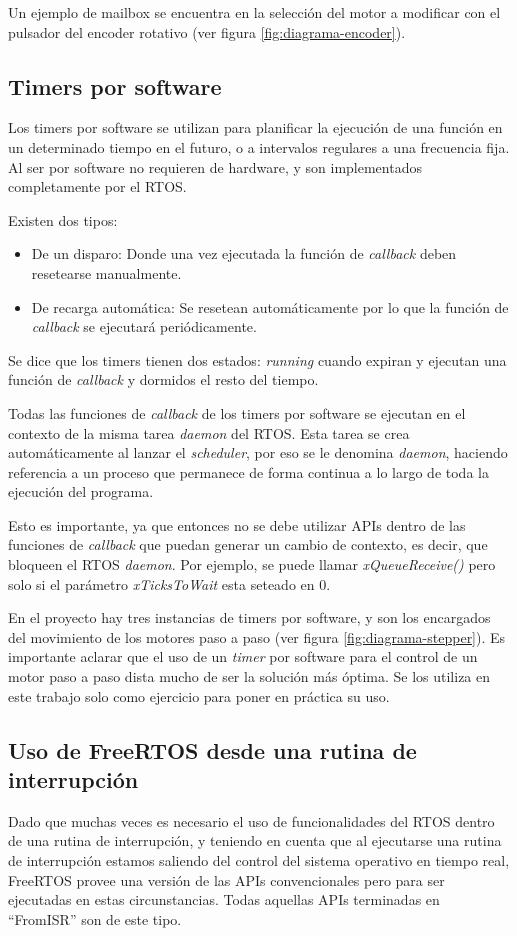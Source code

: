 \documentclass{IEEEtran}
\begin{document}
Un ejemplo de mailbox se encuentra en la selección del motor a modificar con el pulsador del encoder rotativo (ver figura \ref{fig:diagrama-encoder}).

\subsection{Timers por software}
\label{sec:software-timer}
Los timers por software se utilizan para planificar la ejecución de una función en un determinado tiempo en el futuro, o a intervalos regulares a una frecuencia fija. Al ser por software no requieren de hardware, y son implementados completamente por el RTOS.

Existen dos tipos:
\begin{itemize}
    \item De un disparo: Donde una vez ejecutada la función de \textit{callback} deben resetearse manualmente.
    \item De recarga automática: Se resetean automáticamente por lo que la función de \textit{callback} se ejecutará periódicamente.
\end{itemize}

Se dice que los timers tienen dos estados: \textit{running} cuando expiran y ejecutan una función de \textit{callback} y dormidos el resto del tiempo.

Todas las funciones de \textit{callback} de los timers por software se ejecutan en el contexto de la misma tarea \textit{daemon} del RTOS. Esta tarea se crea automáticamente al lanzar el \textit{scheduler}, por eso se le denomina \textit{daemon}, haciendo referencia a un proceso que permanece de forma continua a lo largo de toda la ejecución del programa.

Esto es importante, ya que entonces no se debe utilizar APIs dentro de las funciones de \textit{callback} que puedan generar un cambio de contexto, es decir, que bloqueen el RTOS \textit{daemon}. Por ejemplo, se puede llamar \textit{xQueueReceive()} pero solo si el parámetro \textit{xTicksToWait} esta seteado en 0.

En el proyecto hay tres instancias de timers por software, y son los encargados del movimiento de los motores paso a paso (ver figura \ref{fig:diagrama-stepper}). Es importante aclarar que el uso de un \textit{timer} por software para el control de un motor paso a paso dista mucho de ser la solución más óptima. Se los utiliza en este trabajo solo como ejercicio para poner en práctica su uso.

\subsection{Uso de FreeRTOS desde una rutina de interrupción}
Dado que muchas veces es necesario el uso de funcionalidades del RTOS dentro de una rutina de interrupción, y teniendo en cuenta que al ejecutarse una rutina de interrupción estamos saliendo del control del sistema operativo en tiempo real, FreeRTOS provee una versión de las APIs convencionales pero para ser ejecutadas en estas circunstancias. Todas aquellas APIs terminadas en ``FromISR'' son de este tipo.
\end{document}
